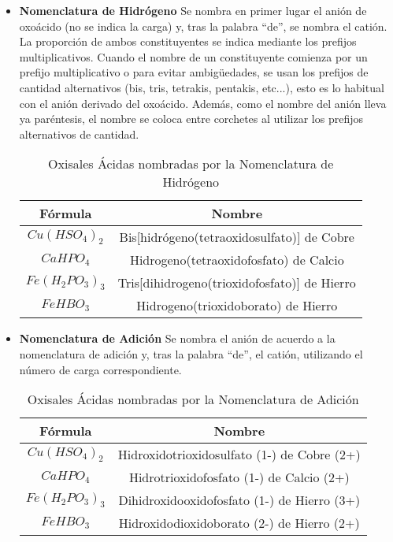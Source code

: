 \documentclass[11pt,fleqn]{book} %
\begin{document}
\begin{itemize}
	\item\textbf{Nomenclatura de Hidrógeno} Se nombra en primer lugar el anión de oxoácido (no se indica la carga) y, tras la palabra “de”, se nombra el catión. La proporción de ambos constituyentes se indica mediante los prefijos multiplicativos. Cuando el nombre de un constituyente comienza por un prefijo multiplicativo o para evitar ambigüedades, se usan los prefijos de cantidad alternativos (bis, tris, tetrakis, pentakis, etc...), esto es lo habitual con el anión derivado del oxoácido. Además, como el nombre del anión lleva ya paréntesis, el nombre se coloca entre corchetes al utilizar los prefijos alternativos de cantidad.\\
	\begin{table}[h!]
		\centering
		\begin{tabular}{c|c}
			Fórmula&Nombre\\ \hline
			$Cu(HSO_4)_2$&Bis[hidrógeno(tetraoxidosulfato)] de Cobre\\
			$CaHPO_4$&Hidrogeno(tetraoxidofosfato) de Calcio\\
			$Fe(H_2PO_3)_3$&Tris[dihidrogeno(trioxidofosfato)] de Hierro \\
			$FeHBO_3$&Hidrogeno(trioxidoborato) de Hierro \\ \hline
		\end{tabular}
			\caption{Oxisales Ácidas nombradas por la Nomenclatura de Hidrógeno}
	\end{table}
	\item\textbf{Nomenclatura de Adición} Se nombra el anión de acuerdo a la nomenclatura de adición y, tras la palabra “de”, el catión, utilizando el número de carga correspondiente.\\
		\begin{table}[h!]
		\centering
		\begin{tabular}{c|c}
			Fórmula&Nombre\\ \hline
			$Cu(HSO_4)_2$&Hidroxidotrioxidosulfato (1-) de Cobre (2+)\\
			$CaHPO_4$&Hidrotrioxidofosfato (1-) de Calcio (2+)\\
			$Fe(H_2PO_3)_3$&Dihidroxidooxidofosfato (1-) de Hierro (3+)\\
			$FeHBO_3$&Hidroxidodioxidoborato (2-) de Hierro (2+)\\ \hline
		\end{tabular}
			\caption{Oxisales Ácidas nombradas por la Nomenclatura de Adición}
	\end{table}
\end{itemize}
\newpage
\end{document}

